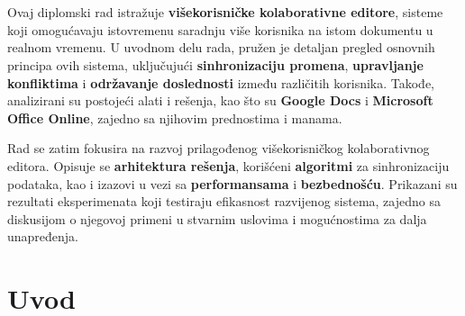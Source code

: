\documentclass[12pt]{article}
\newcommand{\startnewsection}{
    \clearpage %
    \ifodd\value{page}\else %
        \hbox{} %
        \newpage %
    \fi
}
\begin{document}
   \renewcommand{\contentsname}{Sadržaj}
   \tableofcontents
   \thispagestyle{empty} %

   \restoregeometry %

   \newpage
   
    \thispagestyle{empty} %
    
    \newcommand{\specialsection}[1]{
       \section*{\centering{#1}} %
    }
    
    \vspace*{0.5in}
    \specialsection{Apstrakt}
    
    \vspace*{0.5in}

    Ovaj diplomski rad istražuje \textbf{višekorisničke kolaborativne editore}, sisteme koji omogućavaju istovremenu saradnju više korisnika na istom dokumentu u realnom vremenu. U uvodnom delu rada, pružen je detaljan pregled osnovnih principa ovih sistema, uključujući \textbf{sinhronizaciju promena}, \textbf{upravljanje konfliktima} i \textbf{održavanje doslednosti} između različitih korisnika. Takođe, analizirani su postojeći alati i rešenja, kao što su \textbf{Google Docs} i \textbf{Microsoft Office Online}, zajedno sa njihovim prednostima i manama.
    
    Rad se zatim fokusira na razvoj prilagođenog višekorisničkog kolaborativnog editora. Opisuje se \textbf{arhitektura rešenja}, korišćeni \textbf{algoritmi} za sinhronizaciju podataka, kao i izazovi u vezi sa \textbf{performansama} i \textbf{bezbednošću}. Prikazani su rezultati eksperimenata koji testiraju efikasnost razvijenog sistema, zajedno sa diskusijom o njegovoj primeni u stvarnim uslovima i mogućnostima za dalja unapređenja.

   \newpage

   \newpage
   \setcounter{page}{1}

   \startnewsection

   \section{Uvod}
\end{document}

